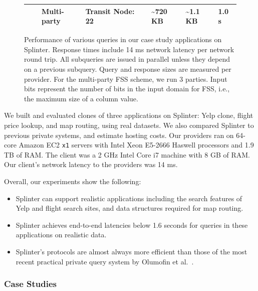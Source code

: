 \begin{figure}
{\begin{tabular}{llllp{1cm}p{2cm}p{2cm}p{1.5cm}}
			& & Multi-party & Transit Node: 22 & & \textasciitilde 720 KB & \textasciitilde 1.1 KB & 1.0 s \\
			\bottomrule
		\end{tabular}
	}
	\caption[Performance results for Splinter case studies.]{Performance of various queries in our case study applications on Splinter. 
		Response times include 14 ms network latency per network round trip. All subqueries are issued in parallel
		unless they depend on a previous subquery. Query and response sizes are measured per provider. For the multi-party FSS scheme, we run 3 parties.
		Input bits represent the number of bits in the input domain for FSS, i.e., the maximum size of a column value.}
	\label{fig:big-results}
\end{figure}

We built and evaluated clones of three applications 
on Splinter: Yelp clone, flight price lookup, and map routing, using real datasets.
We also compared Splinter to previous private systems, and estimate hosting costs.
Our providers ran on 64-core Amazon EC2 \texttt{x1} servers with Intel Xeon E5-2666 Haswell processors and 1.9 TB 
of RAM. The client was a 2 GHz Intel Core i7 machine with 8 GB of RAM.
Our client's network latency to the providers was 14 ms.

Overall, our experiments show the following: 
\begin{itemize}
	\item{Splinter can support realistic applications including the search features of Yelp and flight search sites, and data structures
		required for map routing.}
	\item{Splinter achieves end-to-end latencies below 1.6 seconds for queries in these applications on realistic data.}
	\item{Splinter's protocols are almost always more efficient than those of 
		the most recent practical private query system by Olumofin et al.~\cite{goldberg}.}
\end{itemize}


\subsubsection{Case Studies}
\label{sec:case_studies}

